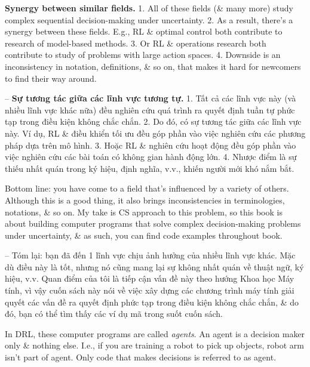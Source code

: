 \documentclass{article}
\begin{document}
\begin{itemize}
\begin{itemize}
\begin{itemize}
            {\bf Synergy between similar fields.} 1. All of these fields (\& many more) study complex sequential decision-making under uncertainty. 2. As a result, there's a synergy between these fields. E.g., RL \& optimal control both contribute to research of model-based methods. 3. Or RL \& operations research both contribute to study of problems with large action spaces. 4. Downside is an inconsistency in notation, definitions, \& so on, that makes it hard for newcomers to find their way around.

            -- {\bf Sự tương tác giữa các lĩnh vực tương tự.} 1. Tất cả các lĩnh vực này (và nhiều lĩnh vực khác nữa) đều nghiên cứu quá trình ra quyết định tuần tự phức tạp trong điều kiện không chắc chắn. 2. Do đó, có sự tương tác giữa các lĩnh vực này. Ví dụ, RL \& điều khiển tối ưu đều góp phần vào việc nghiên cứu các phương pháp dựa trên mô hình. 3. Hoặc RL \& nghiên cứu hoạt động đều góp phần vào việc nghiên cứu các bài toán có không gian hành động lớn. 4. Nhược điểm là sự thiếu nhất quán trong ký hiệu, định nghĩa, v.v., khiến người mới khó nắm bắt.

            Bottom line: you have come to a field that's influenced by a variety of others. Although this is a good thing, it also brings inconsistencies in terminologies, notations, \& so on. My take is CS approach to this problem, so this book is about building computer programs that solve complex decision-making problems under uncertainty, \& as such, you can find code examples throughout book.

            -- Tóm lại: bạn đã đến 1 lĩnh vực chịu ảnh hưởng của nhiều lĩnh vực khác. Mặc dù điều này là tốt, nhưng nó cũng mang lại sự không nhất quán về thuật ngữ, ký hiệu, v.v. Quan điểm của tôi là tiếp cận vấn đề này theo hướng Khoa học Máy tính, vì vậy cuốn sách này nói về việc xây dựng các chương trình máy tính giải quyết các vấn đề ra quyết định phức tạp trong điều kiện không chắc chắn, \& do đó, bạn có thể tìm thấy các ví dụ mã trong suốt cuốn sách.

            In DRL, these computer programs are called {\it agents}. An agent is a decision maker only \& nothing else. I.e., if you are training a robot to pick up objects, robot arm isn't part of agent. Only code that makes decisions is referred to as agent.


\end{itemize}
\end{itemize}
\end{itemize}
\end{document}
